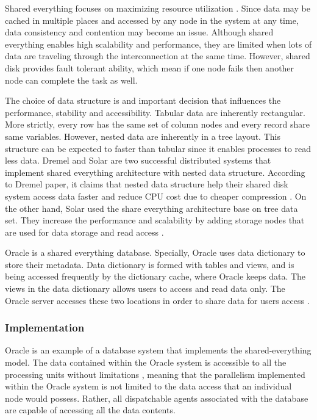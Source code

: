 \documentclass[onecolumn, draftclsnofoot,10pt, compsoc]{IEEEtran}
\begin{document}
Shared everything focuses on maximizing resource utilization \cite{ClaussenBestofBoth}. 
Since data may be cached in multiple places and accessed by any node in the system at any time, data consistency and contention may become an issue.
Although shared everything enables high scalability and performance, they are limited when lots of data are traveling through the interconnection at the same time. 
However, shared disk provides fault tolerant ability, which mean if one node fails then another node can complete the task as well.  

The choice of data structure is and important decision that influences the performance, stability and accessibility.
Tabular data are inherently rectangular.
More strictly, every row has the same set of column nodes and every record share same variables.
However, nested data are inherently in a tree layout.
This structure can be expected to faster than tabular since it enables processes to read less data.
Dremel and Solar are two successful distributed systems that implement shared everything architecture with nested data structure.
According to Dremel paper, it claims that nested data structure help their shared disk system access data faster and reduce CPU cost due to cheaper compression \cite{Dremel}.
On the other hand, Solar used the share everything architecture base on tree data set.
They increase the performance and scalability by adding storage nodes that are used for data storage and read access \cite{zhu2018solar}.  

Oracle is a shared everything database.
Specially, Oracle uses data dictionary to store their metadata. 
Data dictionary is formed with tables and views, and is being accessed frequently by the dictionary cache, where Oracle keeps data. 
The views in the data dictionary allows users to access and read data only.
The Oracle server accesses these two locations in order to share data for users access \cite{OracleDataDictionary}.
\subsubsection{Implementation}
Oracle is an example of a database system that implements the shared-everything model.
The data contained within the Oracle system is accessible to all the processing units without limitations \cite{OraclePEwODF}, meaning that the parallelism implemented within the Oracle system is not limited to the data access that an individual node would possess.
Rather, all dispatchable agents associated with the database are capable of accessing all the data contents.
\end{document}
